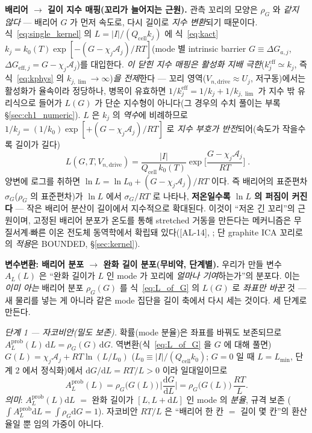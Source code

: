 \documentclass[11pt,a4paper]{article}
\newcommand{\dd}{\mathrm{d}}
\newcommand{\eff}{\mathrm{eff}}
\newcommand{\drive}{\mathrm{drive}}
\newcommand{\cell}{\mathrm{cell}}
\newcommand{\AL}[1]{\textsf{[AL-#1]}}
\begin{document}
\textbf{배리어 $\to$ 길이 지수 매핑(꼬리가 늘어지는 근원).} 관측 꼬리의 모양은 $\rho_G$ 와 \emph{같지 않다}
— 배리어 $G$ 가 먼저 속도로, 다시 길이로 \emph{지수 변환}되기 때문이다. 식~\eqref{eq:single_kernel} 의
$L=|I|/(Q_\cell k_j)$ 에 식~\eqref{eq:kact} $k_j=k_0(T)\exp[-(G-\chi_j\mathcal A_j)/RT]$(mode 별 intrinsic
barrier $G\equiv\Delta G_{a,j}$, $\Delta G_{\eff,j}=G-\chi_j\mathcal A_j$)를 대입한다. \emph{이 닫힌 지수 매핑은
활성화 지배 극한}($k_j^{\eff}\simeq k_j$, 즉 식~\eqref{eq:kphys} 의 $k_{j,\lim}\to\infty$)\emph{을 전제}한다 — 꼬리
영역($V_{n,\drive}\approx U_j$, 저구동)에서는 활성화가 율속이라 정당하나, 병목이 유효하면
$1/k_j^{\eff}=1/k_j+1/k_{j,\lim}$ 가 지수 밖 유리식으로 들어가 $L(G)$ 가 단순 지수형이 아니다(그 경우의 수치 풀이는
부록 \S\ref{sec:ch1_numeric}). $L$ 은 $k_j$ 의 \emph{역수}에 비례하므로 $1/k_j=(1/k_0)\exp[+(G-\chi_j\mathcal A_j)/RT]$ 로
\emph{지수 부호가 반전}되어(속도가 작을수록 길이가 길다)
\begin{equation}
\boxed{\;L(G,T,V_{n,\drive})=\frac{|I|}{Q_\cell\,k_0(T)}\exp\!\Big[\frac{G-\chi_j\mathcal A_j}{RT}\Big]\;.}
\label{eq:L_of_G}
\end{equation}
양변에 로그를 취하면 $\ln L=\ln L_0+(G-\chi_j\mathcal A_j)/RT$ 이다. 즉 배리어의 표준편차 $\sigma_G$($\rho_G$ 의
표준편차)가 $\ln L$ 에서 $\sigma_G/RT$ 로 나타나, \textbf{저온일수록 $\ln L$ 의 퍼짐이 커진다} — 작은 배리어 분산이 길이에서
지수적으로 확대된다. 이것이 ``저온 긴 꼬리''의 근원이며, 고정된 배리어 분포가 온도를 통해 stretched 거동을
만든다는 메커니즘은 무질서계$\cdot$빠른 이온 전도체 동역학에서 확립돼 있다(\AL{14},
\cite{svare2000,johnston2006,lindsey1980}; 단 graphite ICA 꼬리로의 \emph{적용}은 BOUNDED, \S\ref{sec:kernel}).

\textbf{변수변환: 배리어 분포 $\to$ 완화 길이 분포(무비약, 단계별).} 우리가 만들 변수 $A_L(L)$ 은 ``완화 길이가
$L$ 인 mode 가 꼬리에 \emph{얼마나 기여}하는가''의 분포다. 이는 \emph{이미 아는} 배리어 분포 $\rho_G(G)$ 를
식~\eqref{eq:L_of_G} 의 $L(G)$ 로 \emph{좌표만 바꾼} 것 — 새 물리를 넣는 게 아니라 같은 mode 집단을 길이 축에서
다시 세는 것이다. 세 단계로 만든다.

\emph{단계 1 — 자코비안(밀도 보존).} 확률(mode 분율)은 좌표를 바꿔도 보존되므로 $A_L^{\mathrm{prob}}(L)\,\dd L
=\rho_G(G)\,\dd G$. 역변환(식~\eqref{eq:L_of_G} 을 $G$ 에 대해 풀면) $G(L)=\chi_j\mathcal A_j+RT\ln(L/L_0)$
($L_0\equiv|I|/(Q_\cell k_0)$; $G=0$ 일 때 $L=L_{\min}$, 단계 2 에서 정식화)에서 $\dd G/\dd L=RT/L>0$ 이라
일대일이므로
\begin{equation}
A_L^{\mathrm{prob}}(L)=\rho_G\big(G(L)\big)\,\Big|\frac{\dd G}{\dd L}\Big|=\rho_G\big(G(L)\big)\,\frac{RT}{L}.
\label{eq:spectrum_prob}
\end{equation}
\emph{의미}: $A_L^{\mathrm{prob}}(L)\dd L$ $=$ 완화 길이가 $[L,L+\dd L]$ 인 mode 의 \emph{분율}, 규격 보존
($\int A_L^{\mathrm{prob}}\dd L=\int\rho_G\dd G=1$). 자코비안 $RT/L$ 은 ``배리어 한 칸 $=$ 길이 몇 칸''의 환산율일
뿐 임의 가중이 아니다.
\end{document}
